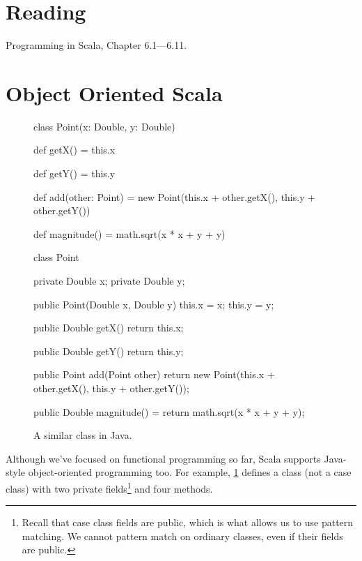 \documentclass{book}
\begin{document}


\newlecture

\section{Reading}

Programming in Scala, Chapter 6.1---6.11.

\section{Object Oriented Scala}

\begin{figure}
\begin{minipage}{0.45\textwidth}
\begin{scalacode}
class Point(x: Double, y: Double) {

  def getX() = this.x

  def getY() = this.y

  def add(other: Point) = {
    new Point(this.x + other.getX(),
              this.y + other.getY())
  }

  def magnitude() = math.sqrt(x * x + y + y)
}
\end{scalacode}
\caption{A class for points.}\label{pointclass}
\end{minipage}
\quad\vrule\quad
\begin{minipage}{0.45\textwidth}
\begin{javacode}
class Point {
  private Double x;
  private Double y;

  public Point(Double x, Double y) {
    this.x = x;
    this.y = y;
  }

  public Double getX() {
    return this.x;
  }

  public Double getY() {
    return this.y;
  }

  public Point add(Point other) {
    return new Point(this.x + other.getX(),
                     this.y + other.getY());
  }

  public Double magnitude() = {
    return math.sqrt(x * x + y + y);
  }
}
\end{javacode}
\caption{A similar class in Java.}
\end{minipage}
\end{figure}

Although we've focused on functional programming so far, Scala supports
Java-style object-oriented programming too. For example, \cref{pointclass}
defines a  class (not a case class) with two private
fields\footnote{Recall that case class fields are public, which
is what allows us to use pattern matching. We cannot pattern match on ordinary classes,
even if their fields are public.} and four methods.
\end{document}
